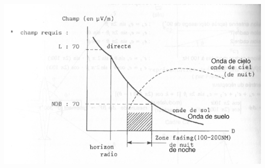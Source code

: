 \begin{description}
\begin{description}
\begin{minipage}[b]{0.5\linewidth}
\end{minipage}
\begin{minipage}[b]{0.5\linewidth}
  \centering
  \includegraphics[width=\linewidth]{06.radionavegacion/Imagenes/06.01.adf/grafico-fading.png}
  \label{fig:fading}
\end{minipage}





\end{description}

\end{description}


